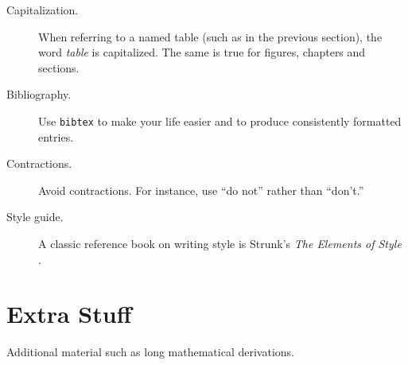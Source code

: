 \documentclass[11pt,a4paper]{book}
\begin{document}
\begin{description}

\item[Capitalization.] When referring to a named table (such as in the
  previous section), the word \emph{table} is capitalized. The same is
  true for figures, chapters and sections.

\item[Bibliography.] Use \verb|bibtex| to make your life easier and to
  produce consistently formatted entries.

\item[Contractions.] Avoid contractions. For instance, use ``do not''
  rather than ``don't.''

\item[Style guide.] A classic reference book on writing style is
  Strunk's \emph{The Elements of Style} \cite{Strunk-ElementsOfStyle}.

\end{description}

\appendix
\chapter{Extra Stuff}
\label{s:ExtraStuff}

Additional material such as long mathematical derivations.


\end{document}

